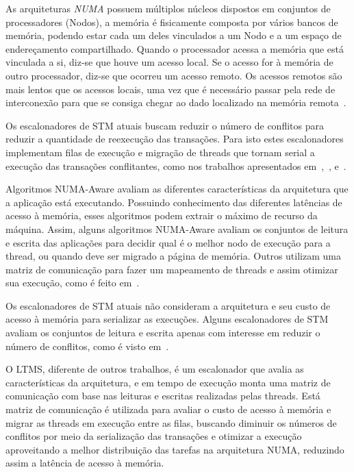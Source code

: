 \documentclass[diss,capa]{texufpel}
\begin{document}
As arquiteturas \emph{NUMA} possuem múltiplos núcleos dispostos em conjuntos de processadores (Nodos), a memória é fisicamente composta por vários bancos de memória, podendo estar cada um deles vinculados a um Nodo e a um espaço de endereçamento compartilhado. Quando o processador acessa a memória que está vinculada a si, diz-se que houve um acesso local. Se o acesso for à memória de outro processador, diz-se que ocorreu um acesso remoto. Os acessos remotos são mais lentos que os acessos locais, uma vez que é necessário passar pela rede de interconexão para que se consiga chegar ao dado localizado na memória remota~\cite{Rodolfo:2014}.

Os escalonadores de STM atuais buscam reduzir o número de conflitos para reduzir a quantidade de reexecução das transações. Para isto estes escalonadores implementam filas de execução e migração de threads que tornam serial a execução das transações conflitantes, como nos trabalhos apresentados em~\cite{shirink2009},~\cite{Nicacio2012}, e~\cite{rito2015}.

Algoritmos NUMA-Aware avaliam as diferentes características da arquitetura que a aplicação está executando. Possuindo conhecimento das diferentes latências de acesso à memória, esses algoritmos podem extrair o máximo de recurso da máquina. Assim, alguns algoritmos NUMA-Aware avaliam os conjuntos de leitura e escrita das aplicações para decidir qual é o melhor nodo de execução para a thread, ou quando deve ser migrado a página de memória. Outros utilizam uma matriz de comunicação para fazer um mapeamento de threads e assim otimizar sua execução, como é feito em~\cite{pasqualin2020thread}.

Os escalonadores de STM atuais não consideram a arquitetura e seu custo de acesso à memória para serializar as execuções. Alguns escalonadores de STM avaliam os conjuntos de leitura e escrita apenas com interesse em reduzir o número de conflitos, como é visto em~\cite{shirink2009}.

O LTMS, diferente de outros trabalhos, é um escalonador que avalia as características da arquitetura, e em tempo de execução monta uma matriz de comunicação com base nas leituras e escritas realizadas pelas threads. Está matriz de comunicação é utilizada para avaliar o custo de acesso à memória e migrar as threads em execução entre as filas, buscando diminuir os números de conflitos por meio da serialização das transações e otimizar a execução aproveitando a melhor distribuição das tarefas na arquitetura NUMA, reduzindo assim a latência de acesso à memória.
\end{document}
